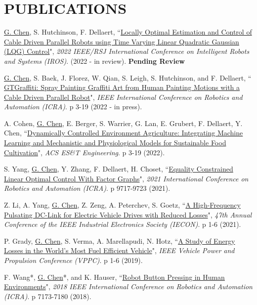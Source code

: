 \documentclass[paper=letter,fontsize=11pt]{scrartcl} %
\newcommand{\NewPart}[2]{\section*{\uppercase{#1} #2}}
\newcommand{\PaperEntry}[7]{
		\noindent #1, ``\href{#7}{#2}", \textit{#3}. \textbf{#4} p #5 (#6).}
\newcommand{\PaperEntryPending}[7]{
		\noindent #1, ``\href{#7}{#2}", \textit{#3}. \textbf{#4} (#6). {\bf Pending Review}}
\begin{document}
\NewPart{Publications}{}
\begin{etaremune}
	\item \PaperEntryPending{\underline{G. Chen}, S. Hutchinson, F. Dellaert}{Locally Optimal Estimation and Control of Cable Driven Parallel Robots using Time Varying Linear Quadratic Gaussian (LQG) Control}{2022 IEEE/RSJ International Conference on Intelligent Robots and Systems (IROS)}{}{}{2022 - in review}{https://gerry-chen.com/publications/Chen22iros_cdpr_control/Chen22iros_cdpr_tracking_control.pdf} \label{pub:chen22iros_cdpr}
	\item \PaperEntry{\underline{G. Chen}, S. Baek, J. Florez, W. Qian, S. Leigh, S. Hutchinson, and F. Dellaert}{
		GTGraffiti: Spray Painting Graffiti Art from Human Painting Motions with a Cable Driven Parallel Robot}{IEEE International Conference on Robotics and Automation (ICRA)}{}{3-19}{2022 - in press}{https://arxiv.org/abs/2109.06238} \label{pub:cohen22est}
	\item \PaperEntry{A. Cohen, \underline{G. Chen}, E. Berger, S. Warrier, G. Lan, E. Grubert, F. Dellaert, Y. Chen}{Dynamically Controlled Environment Agriculture: Integrating Machine Learning and Mechanistic and Physiological Models for Sustainable Food Cultivation}{ACS ES\&T Engineering}{}{3-19}{2022}{https://doi.org/10.1021/acsestengg.1c00269} \label{pub:cohen22est}
	\item \PaperEntry{S. Yang, \underline{G. Chen}, Y. Zhang, F. Dellaert, H. Choset}{Equality Constrained Linear Optimal Control With Factor Graphs}{2021 International Conference on Robotics and Automation (ICRA)}{}{9717-9723}{2021}{https://doi.org/10.1109/ICRA48506.2021.9562000} \label{pub:yang20icra}
	\item \PaperEntry{Z. Li, A. Yang, \underline{G. Chen}, Z. Zeng, A. Peterchev, S. Goetz}{A High-Frequency Pulsating DC-Link for Electric Vehicle Drives with Reduced Losses}{47th Annual Conference of the IEEE Industrial Electronics Society (IECON)}{}{1-6}{2021}{https://doi.org/10.1109/IECON48115.2021.9589040}
	\item \PaperEntry{P. Grady, \underline{G. Chen}, S. Verma, A. Marellapudi, N. Hotz}{A Study of Energy Losses in the World's Most Fuel Efficient Vehicle}{IEEE Vehicle Power and Propulsion Conference (VPPC)}{}{1-6}{2019}{https://doi.org/10.1109/VPPC46532.2019.8952212} \label{pub:grady19vppc}
	\item \PaperEntry{F. Wang*, \underline{G. Chen}*, and K. Hauser}{Robot Button Pressing in Human Environments}{2018 IEEE International Conference on Robotics and Automation (ICRA)}{}{7173-7180}{2018}{http://doi.org/10.1109/ICRA.2018.8463180} \label{pub:wang18icra}

\end{etaremune}
\end{document}
